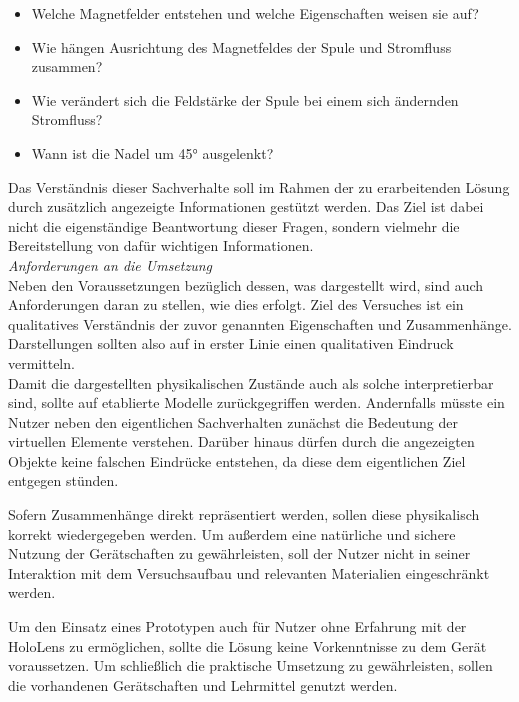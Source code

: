 \begin{itemize}
	\setlength{\itemsep}{-3pt}
	\item Welche Magnetfelder entstehen und welche Eigenschaften weisen sie auf?
	\item Wie hängen Ausrichtung des Magnetfeldes der Spule und Stromfluss zusammen?
	\item Wie verändert sich die Feldstärke der Spule bei einem sich ändernden Stromfluss?
	\item Wann ist die Nadel um 45° ausgelenkt?
\end{itemize}

Das Verständnis dieser Sachverhalte soll im Rahmen der zu erarbeitenden Lösung durch zusätzlich angezeigte Informationen gestützt werden. Das Ziel ist dabei nicht die eigenständige Beantwortung dieser Fragen, sondern vielmehr die Bereitstellung von dafür wichtigen Informationen.\\

\textit{Anforderungen an die Umsetzung}\\
Neben den Voraussetzungen bezüglich dessen, was dargestellt wird, sind auch Anforderungen daran zu stellen, wie dies erfolgt. Ziel des Versuches ist ein qualitatives Verständnis der zuvor genannten Eigenschaften und Zusammenhänge. Darstellungen sollten also auf in erster Linie einen qualitativen Eindruck vermitteln.\\

Damit die dargestellten physikalischen Zustände auch als solche interpretierbar sind, sollte auf etablierte Modelle zurückgegriffen werden. Andernfalls müsste ein Nutzer neben den eigentlichen Sachverhalten zunächst die Bedeutung der virtuellen Elemente verstehen. Darüber hinaus dürfen durch die angezeigten Objekte keine falschen Eindrücke entstehen, da diese dem eigentlichen Ziel entgegen stünden. 
\par
\noindent\hspace*{5mm}
Sofern Zusammenhänge direkt repräsentiert werden, sollen diese physikalisch korrekt wiedergegeben werden. Um außerdem eine natürliche und sichere Nutzung der Gerätschaften zu gewährleisten, soll der Nutzer nicht in seiner Interaktion mit dem Versuchsaufbau und relevanten Materialien eingeschränkt werden.
\par
\noindent\hspace*{5mm}
Um den Einsatz eines Prototypen auch für Nutzer ohne Erfahrung mit der HoloLens zu ermöglichen, sollte die Lösung keine Vorkenntnisse zu dem Gerät voraussetzen. Um schließlich die praktische Umsetzung zu gewährleisten, sollen die vorhandenen Gerätschaften und Lehrmittel genutzt werden.\\


